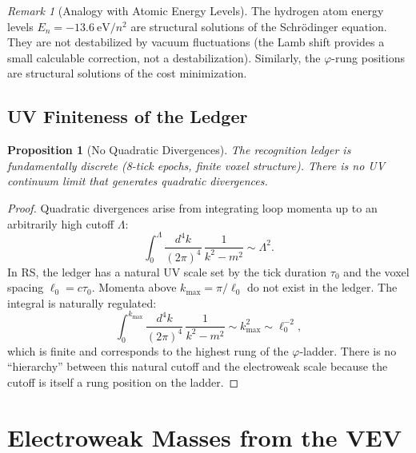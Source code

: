 \documentclass[12pt,a4paper]{article}
\newtheorem{proposition}[theorem]{Proposition}
\theoremstyle{definition}
\theoremstyle{remark}
\newtheorem{remark}[theorem]{Remark}
\begin{document}
\begin{remark}[Analogy with Atomic Energy Levels]
The hydrogen atom energy levels
$E_n = -13.6~\mathrm{eV}/n^2$ are structural solutions of
the Schr\"odinger equation.  They are not destabilized by
vacuum fluctuations (the Lamb shift provides a small
calculable correction, not a destabilization).  Similarly,
the $\varphi$-rung positions are structural solutions of the
cost minimization.
\end{remark}

\subsection{UV Finiteness of the Ledger}

\begin{proposition}[No Quadratic Divergences]
\label{prop:uv}
The recognition ledger is fundamentally discrete (8-tick
epochs, finite voxel structure).  There is no UV continuum
limit that generates quadratic divergences.
\end{proposition}

\begin{proof}
Quadratic divergences arise from integrating loop momenta
up to an arbitrarily high cutoff $\Lambda$:
\begin{equation}
  \int_0^\Lambda \frac{d^4k}{(2\pi)^4}\,
  \frac{1}{k^2 - m^2} \sim \Lambda^2.
\end{equation}
In RS, the ledger has a natural UV scale set by the tick
duration $\tau_0$ and the voxel spacing $\ell_0 = c\tau_0$.
Momenta above $k_{\max} = \pi/\ell_0$ do not exist in the
ledger.  The integral is naturally regulated:
\begin{equation}
  \int_0^{k_{\max}} \frac{d^4k}{(2\pi)^4}\,
  \frac{1}{k^2 - m^2} \sim k_{\max}^2 \sim \ell_0^{-2},
\end{equation}
which is finite and corresponds to the highest rung of the
$\varphi$-ladder.  There is no ``hierarchy'' between this
natural cutoff and the electroweak scale because the cutoff
is itself a rung position on the ladder.
\end{proof}

\section{Electroweak Masses from the VEV}
\label{sec:masses}
\end{document}
